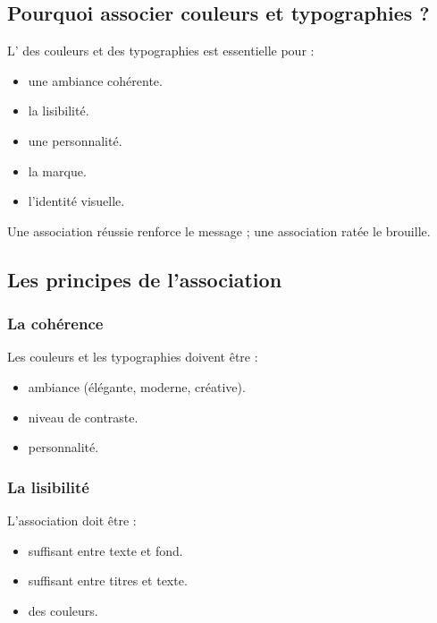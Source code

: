 \subsection{Pourquoi associer couleurs et typographies ?}

L' des couleurs et des typographies est essentielle pour :

\begin{itemize}
    \item {} une ambiance cohérente.
    \item {} la lisibilité.
    \item {} une personnalité.
    \item {} la marque.
    \item {} l'identité visuelle.
\end{itemize}

Une association réussie renforce le message ; une association ratée le brouille.

\subsection{Les principes de l'association}

\subsubsection{La cohérence}

Les couleurs et les typographies doivent être  :

\begin{itemize}
    \item {} ambiance (élégante, moderne, créative).
    \item {} niveau de contraste.
    \item {} personnalité.
\end{itemize}

\subsubsection{La lisibilité}

L'association doit être  :

\begin{itemize}
    \item {} suffisant entre texte et fond.
    \item {} suffisant entre titres et texte.
    \item {} des couleurs.
\end{itemize}

